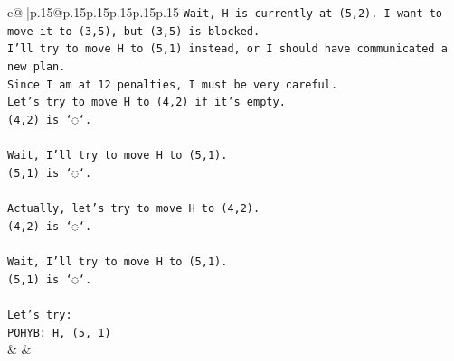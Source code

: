 \documentclass{article}
\begin{document}
{\begin{supertabular}{c@{$\;$}|p{.15\linewidth}@{}p{.15\linewidth}p{.15\linewidth}p{.15\linewidth}p{.15\linewidth}p{.15\linewidth}}
{{{\texttt{Wait, H is currently at (5,2). I want to move it to (3,5), but (3,5) is blocked.} \\
\texttt{I'll try to move H to (5,1) instead, or I should have communicated a new plan.} \\
\texttt{Since I am at 12 penalties, I must be very careful.} \\
\texttt{Let's try to move H to (4,2) if it's empty.} \\
\texttt{(4,2) is `◌`.} \\
\\ 
\texttt{Wait, I'll try to move H to (5,1).} \\
\texttt{(5,1) is `◌`.} \\
\\ 
\texttt{Actually, let's try to move H to (4,2).} \\
\texttt{(4,2) is `◌`.} \\
\\ 
\texttt{Wait, I'll try to move H to (5,1).} \\
\texttt{(5,1) is `◌`.} \\
\\ 
\texttt{Let's try:} \\
\texttt{POHYB: H, (5, 1)} \\
            }
        }
    }
    & & \\ \\


\end{supertabular}}
\end{document}

